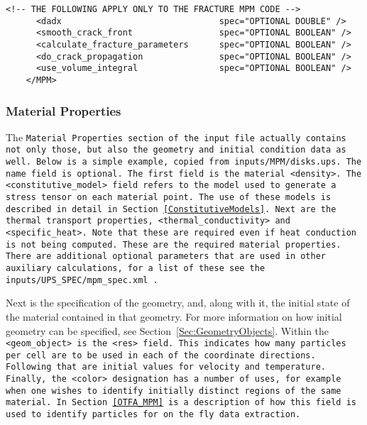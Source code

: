 \begin{Verbatim}[fontsize=\footnotesize]
      <!-- THE FOLLOWING APPLY ONLY TO THE FRACTURE MPM CODE -->
      <dadx                               spec="OPTIONAL DOUBLE" />
      <smooth_crack_front                 spec="OPTIONAL BOOLEAN" />
      <calculate_fracture_parameters      spec="OPTIONAL BOOLEAN" />
      <do_crack_propagation               spec="OPTIONAL BOOLEAN" />
      <use_volume_integral                spec="OPTIONAL BOOLEAN" />
    </MPM>
\end{Verbatim}



\subsubsection{Material Properties} \label{mat_props}

The \tt Material Properties \normalfont section of the input file
actually contains not only those, but also the geometry and initial
condition data as well.  Below is a simple example, copied from
\tt inputs/MPM/disks.ups. \normalfont  The \tt name \normalfont field
is optional.  The first field is the material \tt <density>. \normalfont
The \tt <constitutive\_model> \normalfont field refers
to the model used to generate a stress tensor on each material point.
The use of these models is described in detail in
Section~\ref{ConstitutiveModels}.  Next are the thermal transport properties,
\tt <thermal\_conductivity> \normalfont and 
\tt <specific\_heat>. \normalfont  Note that these are required even if
heat conduction is not being computed.  These are the required material
properties.  There are additional optional parameters that are used in
other auxiliary calculations, for a list of these
see the \tt inputs/UPS\_SPEC/mpm\_spec.xml \normalfont.

Next is the specification of the geometry, and, along with it, the initial
state of the material contained in that geometry.  For more information on
how initial geometry can be specified, see Section~\ref{Sec:GeometryObjects}.  Within the
\tt <geom\_object> \normalfont is the \tt <res> \normalfont field.  This
indicates how many particles per cell are to be used in each of the 
coordinate directions.  Following that are initial values for velocity and
temperature.  Finally, the \tt <color> \normalfont designation has a number
of uses, for example when one wishes to identify initially distinct regions
of the same material.  In Section~\ref{OTFA_MPM} is a description of how
this field is used to identify particles for on the fly data extraction.

